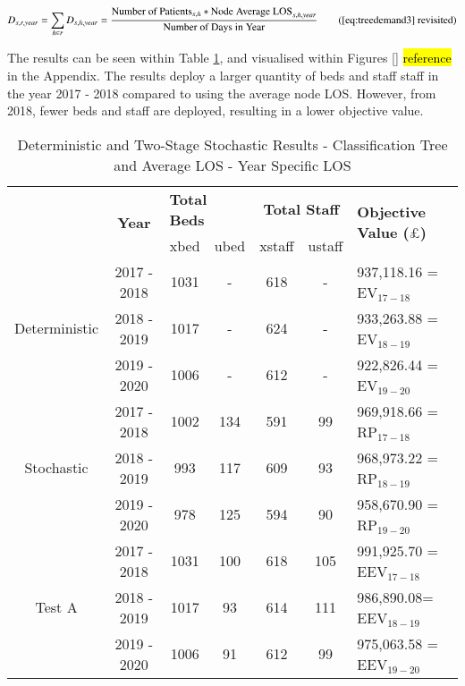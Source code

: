 \documentclass[../thesis.tex]{subfiles}
\begin{document}
\begin{equation}
        D_{s,r,year} = \sum\limits_{h \in r} D_{s,h,year} = \frac{\text{Number of Patients}_{s,h}*\text{Node Average LOS}_{s,h,year}}{\text{Number of Days in Year}} \tag{\ref{eq:treedemand3} revisited}
\end{equation}

The results can be seen within Table \ref{tab:Results8}, and visualised within Figures \ref{} \hl{reference} in the Appendix. The results deploy a larger quantity of beds and staff staff in the year 2017 - 2018 compared to using the average node LOS. However, from 2018, fewer beds and staff are deployed, resulting in a lower objective value.

\begin{table}[h!]
    \centering
    \begin{tabular}{ccccccl}\toprule
 & \multirow{2}{*}{\textbf{Year}}& \multicolumn{2}{l}{\textbf{Total Beds}} & \multicolumn{2}{c}{\textbf{Total Staff}} & \multirow{2}{*}{\textbf{Objective Value ($\pounds$)}}\\ \cmidrule(lr){3-4} \cmidrule(lr){5-6}
&& xbed           & ubed          & xstaff         & ustaff         \\ \midrule
     \multirow{3}{*}{Deterministic} & 2017 - 2018 & 1031  & - & 618  & - & 937,118.16 =  EV$_{17-18}$ \\ 
      & 2018 - 2019 & 1017& - & 624 & - &  933,263.88 =  EV$_{18-19}$ \\
      & 2019 - 2020 & 1006  & - & 612 & - &  922,826.44 =  EV$_{19-20}$\\ \midrule
     \multirow{3}{*}{Stochastic} & 2017 - 2018 & 1002 & 134 &591  & 99 &  969,918.66 = RP$_{17-18}$ \\ 
      & 2018 - 2019 &  993 & 117  & 609  &  93& 968,973.22 =  RP$_{18-19}$ \\
      & 2019 - 2020 & 978 & 125 & 594 & 90& 958,670.90 =  RP$_{19-20}$\\ \midrule    
     \multirow{3}{*}{Test A} & 2017 - 2018 & 1031 & 100 & 618  &105  & 991,925.70 = EEV$_{17-18}$ \\ 
      & 2018 - 2019& 1017 &93 & 614  & 111 & 986,890.08=  EEV$_{18-19}$ \\
      & 2019 - 2020 & 1006 & 91 &612  &99 & 975,063.58 = EEV$_{19-20}$\\ \bottomrule       
    \end{tabular}
    \caption{Deterministic and Two-Stage Stochastic Results - Classification Tree and Average LOS - Year Specific LOS}
    \label{tab:Results8}
\end{table}
\end{document}

